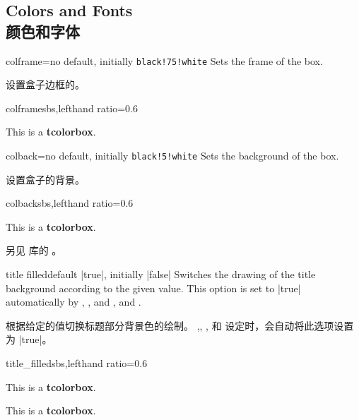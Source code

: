 \setcounter{section}{4}
\setcounter{subsection}{4}
\setcounter{subsubsection}{0}
\subsection{Colors and Fonts\\颜色和字体}

\begin{docTcbKey}{colframe}{=}{no default, initially \texttt{black!75!white}}
Sets the frame  of the box.

设置盒子边框的。
\begin{exdispExample*}{colframe}{sbs,lefthand ratio=0.6}
\begin{tcolorbox}[colframe=red!50!white]
This is a \textbf{tcolorbox}.
\end{tcolorbox}
\end{exdispExample*}
\end{docTcbKey}

\begin{docTcbKey}{colback}{=}{no default, initially \texttt{black!5!white}}
Sets the background  of the box.

设置盒子的背景。
\begin{exdispExample*}{colback}{sbs,lefthand ratio=0.6}
\begin{tcolorbox}[colback=red!50!white]
This is a \textbf{tcolorbox}.
\end{tcolorbox}
\end{exdispExample*}
\end{docTcbKey}

另见  库的 。

\begin{docTcbKey}{title filled}{}{default |true|, initially |false|}
Switches the drawing of the title background according to the given value.
This option is set to |true| automatically by ,
, and ,
and .

根据给定的值切换标题部分背景色的绘制。
,, ,
和  设定时，会自动将此选项设置为 |true|。

\begin{exdispExample*}{title_filled}{sbs,lefthand ratio=0.6}
\begin{tcolorbox}[title=My title,title filled]
This is a \textbf{tcolorbox}.
\end{tcolorbox}
\begin{tcolorbox}[title=My title,
title filled=false]
This is a \textbf{tcolorbox}.
\end{tcolorbox}
\end{exdispExample*}
\end{docTcbKey}


